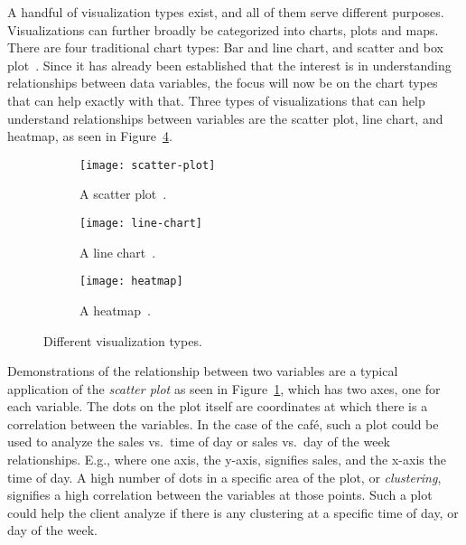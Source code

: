 A handful of visualization types exist, and all of them serve different purposes.
Visualizations can further broadly be categorized into charts, plots and maps.
There are four traditional chart types: Bar and line chart, and scatter and box plot~\cite{atlassianChartTypes}.
Since it has already been established that the interest is in understanding relationships between data variables, the
focus will now be on  the chart types that can help exactly with that.
Three types of visualizations that can help understand relationships between variables are the scatter plot, line
chart, and heatmap, as seen in Figure~\ref{fig:visualization-types}.

\begin{figure}[H]
    \centering
    \begin{subfigure}{.3\textwidth}
        \centering
        \texttt{[image: scatter-plot]}
        \caption{A scatter plot~\cite{atlassianChartTypes}.
        }\label{subfig:scatter-plot}
    \end{subfigure}
    \begin{subfigure}{.3\textwidth}
        \centering
        \texttt{[image: line-chart]}
        \caption{A line chart~\cite{atlassianChartTypes}.
        }\label{subfig:line-chart}
    \end{subfigure}
    \begin{subfigure}{.3\textwidth}
        \centering
        \texttt{[image: heatmap]}
        \caption{A heatmap~\cite{atlassianHeatmaps}.
        }\label{subfig:heatmap}
    \end{subfigure}
    \caption{Different visualization types.
    }\label{fig:visualization-types}
\end{figure}

Demonstrations of the relationship between two variables are a typical application of the \textit{scatter plot}
as seen in Figure~\ref{subfig:scatter-plot}, which has two axes, one for each variable.
The dots on the plot itself are coordinates at which there is a correlation between the variables.
In the case of the café, such a plot could be used to analyze the sales vs.\ time of day or sales vs.\ day of the week
relationships.
E.g., where one axis, the y-axis, signifies sales, and the x-axis the time of day.
A high number of dots in a specific area of the plot, or \textit{clustering}, signifies a high correlation between the
variables at those points.
Such a plot could help the client analyze if there is any clustering at a specific time of day, or day of the week.

